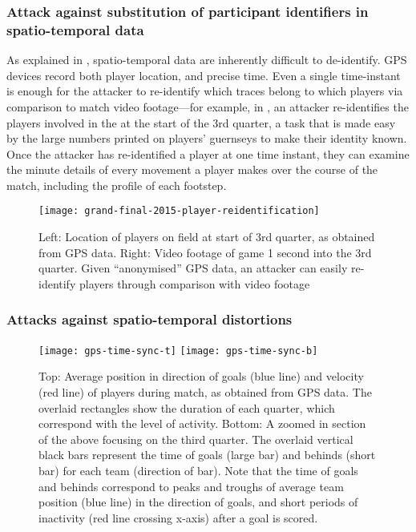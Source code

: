 \subsubsection{Attack against substitution of participant identifiers in spatio-temporal data}

As explained in , spatio-temporal data are inherently difficult to de-identify. GPS devices record both player location, and precise time. Even a single time-instant is enough for the attacker to re-identify which traces belong to which players via comparison to match video footage---for example, in , an attacker re-identifies the players involved in the \centrebounce{} at the start of the 3rd quarter, a task that is made easy by the large numbers printed on players' guernseys to make their identity known. Once the attacker has re-identified a player at one time instant, they can examine the minute details of every movement a player makes over the course of the match, including the profile of each footstep.

\begin{figure}[htbp]
  \centering
  \texttt{[image: grand-final-2015-player-reidentification]}
  \caption{Left: Location of players on field at start of 3rd quarter, as obtained from GPS data. Right: Video footage of game 1 second into the 3rd quarter. Given ``anonymised'' GPS data, an attacker can easily re-identify players through comparison with video footage}
  \label{fig:vid}
\end{figure}

\subsubsection{Attacks against spatio-temporal distortions}

\begin{figure}[htbp]
  \centering
  \texttt{[image: gps-time-sync-t]}
  \texttt{[image: gps-time-sync-b]}
  \caption{Top: Average position in direction of goals (blue line) and velocity (red line) of players during match, as obtained from GPS data. The overlaid rectangles show the duration of each quarter, which correspond with the level of activity. Bottom: A zoomed in section of the above focusing on the third quarter. The overlaid vertical black bars represent the time of goals (large bar) and behinds (short bar) for each team (direction of bar). Note that the time of goals and behinds correspond to peaks and troughs of average team position (blue line) in the direction of goals, and short periods of inactivity (red line crossing x-axis) after a goal is scored.}
  \label{fig:gps-time-sync}
\end{figure}

